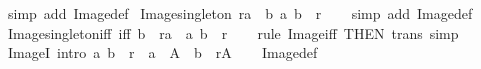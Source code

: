 \begin{isabellebody}
%
\isatagproof
{}\isamarkupfalse%
\ {\isacharparenleft}{\kern0pt}simp\ add{\isacharcolon}{\kern0pt}\ Image{\isacharunderscore}{\kern0pt}def{\isacharparenright}{\kern0pt}%
\endisatagproof
{\isafoldproof}%
%
\isadelimproof
\isanewline
%
\endisadelimproof
\isanewline
{}\isamarkupfalse%
\ Image{\isacharunderscore}{\kern0pt}singleton{\isacharcolon}{\kern0pt}\ {\isachardoublequoteopen}r{\isacharbackquote}{\kern0pt}{\isacharbackquote}{\kern0pt}{\isacharbraceleft}{\kern0pt}a{\isacharbraceright}{\kern0pt}\ {\isacharequal}{\kern0pt}\ {\isacharbraceleft}{\kern0pt}b{\isachardot}{\kern0pt}\ {\isacharparenleft}{\kern0pt}a{\isacharcomma}{\kern0pt}\ b{\isacharparenright}{\kern0pt}\ {\isasymin}\ r{\isacharbraceright}{\kern0pt}{\isachardoublequoteclose}\isanewline
%
\isadelimproof
\ \ %
\endisadelimproof
%
\isatagproof
{}\isamarkupfalse%
\ {\isacharparenleft}{\kern0pt}simp\ add{\isacharcolon}{\kern0pt}\ Image{\isacharunderscore}{\kern0pt}def{\isacharparenright}{\kern0pt}%
\endisatagproof
{\isafoldproof}%
%
\isadelimproof
\isanewline
%
\endisadelimproof
\isanewline
{}\isamarkupfalse%
\ Image{\isacharunderscore}{\kern0pt}singleton{\isacharunderscore}{\kern0pt}iff\ {\isacharbrackleft}{\kern0pt}iff{\isacharbrackright}{\kern0pt}{\isacharcolon}{\kern0pt}\ {\isachardoublequoteopen}b\ {\isasymin}\ r{\isacharbackquote}{\kern0pt}{\isacharbackquote}{\kern0pt}{\isacharbraceleft}{\kern0pt}a{\isacharbraceright}{\kern0pt}\ {\isasymlongleftrightarrow}\ {\isacharparenleft}{\kern0pt}a{\isacharcomma}{\kern0pt}\ b{\isacharparenright}{\kern0pt}\ {\isasymin}\ r{\isachardoublequoteclose}\isanewline
%
\isadelimproof
\ \ %
\endisadelimproof
%
\isatagproof
{}\isamarkupfalse%
\ {\isacharparenleft}{\kern0pt}rule\ Image{\isacharunderscore}{\kern0pt}iff\ {\isacharbrackleft}{\kern0pt}THEN\ trans{\isacharbrackright}{\kern0pt}{\isacharparenright}{\kern0pt}\ simp%
\endisatagproof
{\isafoldproof}%
%
\isadelimproof
\isanewline
%
\endisadelimproof
\isanewline
{}\isamarkupfalse%
\ ImageI\ {\isacharbrackleft}{\kern0pt}intro{\isacharbrackright}{\kern0pt}{\isacharcolon}{\kern0pt}\ {\isachardoublequoteopen}{\isacharparenleft}{\kern0pt}a{\isacharcomma}{\kern0pt}\ b{\isacharparenright}{\kern0pt}\ {\isasymin}\ r\ {\isasymLongrightarrow}\ a\ {\isasymin}\ A\ {\isasymLongrightarrow}\ b\ {\isasymin}\ r{\isacharbackquote}{\kern0pt}{\isacharbackquote}{\kern0pt}A{\isachardoublequoteclose}\isanewline
%
\isadelimproof
\ \ %
\endisadelimproof
%
\isatagproof
{}\isamarkupfalse%
\ Image{\isacharunderscore}{\kern0pt}def\ \isamarkupfalse%

\end{isabellebody}
